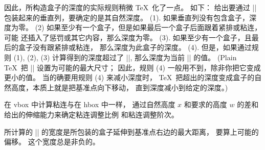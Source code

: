 \ddanger 因此，所构造盒子的深度的实际规则稍微 \TeX\ 化了一点。%
如下：
给出要通过 |\vbox| 包装起来的垂直列，要确定的是其自然深度。%
(1). 如果垂直列没有包含盒子，深度为零。%
(2) 如果至少有一个盒子，但是如果最后一个盒子后面跟着紧排或粘连，可能%
还插入了惩罚或其它内容，那么深度为零。%
(3). 如果至少有一个盒子，且最后的盒子没有跟紧排或粘连，
那么深度为此盒子的深度。%
\1(4). 但是，如果通过规则 (1), (2), (3) 计算得到的深度超过了 |\boxmaxdepth|,
那么深度为当前 |\boxmaxdepth| 的值。%
(Plain \TeX\ 把 |\boxmaxdepth| 设置为可能的最大尺寸；
因此，规则 (4) 一般用不到，除非你把它变成更小的值。%
当的确要用规则 (4) 来减小深度时，
 \TeX\ 把超出的深度变成盒子的自然高度，本质上就是把基准点向下移动，
直到深度减小到给定的深度。)

\danger 在 vbox 中计算粘连与在 hbox 中一样，
通过自然高度 $x$ 和要求的高度 $w$ 的差和给出的伸缩能力来确定粘连调整比例%
和粘连调整阶次。

\danger 所计算的 |\vbox| 的宽度是所包装的盒子延伸到基准点右边的最大距离，
要算上可能的偏移。%
这个宽度总是非负的。


